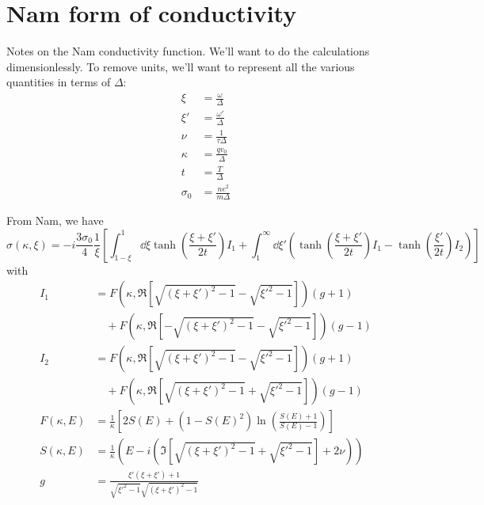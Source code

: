 \documentclass[11pt]{article}
\begin{document}
\graphicspath{{figures/}}

\section{Nam form of conductivity} \label{sec:NamForm}

Notes on the Nam conductivity function.
We'll want to do the calculations dimensionlessly.
To remove units, we'll want to represent all the various quantities in terms of $\Delta$:
\begin{align}
	\xi &= \frac{\omega}{\Delta} \\
	\xi' &= \frac{\omega'}{\Delta} \\
	\nu &= \frac{1}{\tau \Delta} \\
	\kappa &= \frac{q v_0}{\Delta} \\
	t &= \frac{T}{\Delta} \\
	\sigma_0 &= \frac{n e^2}{m \Delta}
\end{align}

From Nam, we have
\begin{equation}
	\sigma(\kappa, \xi) = -i \frac{3 \sigma_0}{4} \frac{1}{\xi}\left[\int_{1 - \xi}^{1}\dd{\xi} \tanh(\frac{\xi + \xi'}{2 t}) I_1 + \int_{1}^{\infty} \dd{\xi'} \left( \tanh(\frac{\xi + \xi'}{2t}) I_1  - \tanh(\frac{\xi'}{2t})I_2 \right) \right]
\end{equation}
with
\begin{align}
	I_1 &= F(\kappa, \Re[\sqrt{(\xi + \xi')^2 - 1} - \sqrt{\xi'^2 - 1}]) (g + 1) \nonumber\\
	&\quad + F(\kappa, \Re[-\sqrt{(\xi + \xi')^2 - 1} - \sqrt{\xi'^2 - 1}]) (g - 1) \\
	I_2 &= F(\kappa, \Re[\sqrt{(\xi + \xi')^2 - 1} - \sqrt{\xi'^2 - 1}]) (g + 1) \nonumber\\
	&\quad + F(\kappa, \Re[\sqrt{(\xi + \xi')^2 - 1} + \sqrt{\xi'^2 - 1}]) (g - 1) \\
	F(\kappa, E) &= \frac{1}{\kappa} \left[2 S(E) + (1 - S(E)^2)\ln(\frac{S(E) + 1}{S(E) - 1})\right]  \\
	S(\kappa, E) &= \frac{1}{\kappa} \left(E - i \left(\Im[\sqrt{(\xi + \xi')^2 - 1} + \sqrt{\xi'^2 - 1}] + 2 \nu \right) \right) \\
	g  &= \frac{\xi' \left( \xi + \xi'\right) + 1}{\sqrt{\xi'^2 - 1}\sqrt{(\xi + \xi')^2 - 1}}
\end{align}
\end{document}
